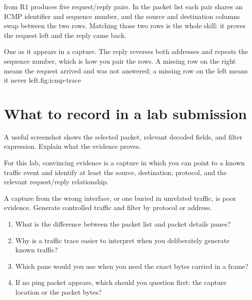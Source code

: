 \begin{workedexample}
 from R1 produces five request/reply pairs. In the
packet list each pair shares an ICMP identifier and sequence number, and
the source and destination columns swap between the two rows. Matching
those two rows is the whole skill: it proves the request left and the
reply came back.
\end{workedexample}

\begin{utpfig}{One  as it appears in a capture.
The reply reverses both addresses and repeats the sequence number, which is how
you pair the rows. A missing row on the right means the request arrived and was
not answered; a missing row on the left means it never left.}{fig:icmp-trace}
\end{utpfig}

\section{What to record in a lab submission}
A useful screenshot shows the selected packet, relevant decoded fields, and filter expression. Explain what the evidence proves.

\begin{verification}
For this lab, convincing evidence is a capture in which you can point to a known traffic event and identify at least the source, destination, protocol, and the relevant request/reply relationship.
\end{verification}

\begin{pitfall}
A capture from the wrong interface, or one buried in unrelated traffic, is poor evidence. Generate controlled traffic and filter by protocol or address.
\end{pitfall}

\begin{quickcheck}
\begin{enumerate}
\item What is the difference between the packet list and packet details panes?
\item Why is a traffic trace easier to interpret when you deliberately generate known traffic?
\item Which pane would you use when you need the exact bytes carried in a frame?
\item If no ping packet appears, which should you question first: the capture location or the packet bytes?
\end{enumerate}
\end{quickcheck}

